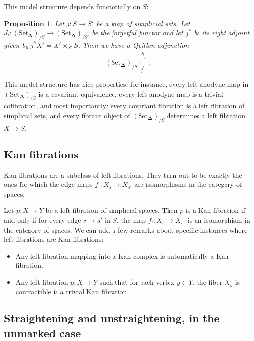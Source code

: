 \documentclass{amsart}
\newcommand{\8}{\ensuremath{\infty}}
\newcommand{\SSet}{\ensuremath{\text{Set}_{\boldsymbol{\Delta}}}}
\newtheorem{proposition}{Proposition}
\begin{document}
This model structure depends functorially on $S$:
\begin{proposition}
  Let $j:S\rightarrow S'$ be a map of simplicial sets. Let $J_!: (\SSet)_{/S}\rightarrow (\SSet)_{/S'}$ be the forgetful functor and let $j^*$ be its right adjoint given by $j^*X' = X'\times_{S'} S$. Then we have a Quillen adjunction
  \[(\SSet)_{/S}\underset{j^*}{\overset{j_!}{\overset{\rightarrow}{\leftarrow}}}.\]
\end{proposition}

This model structure has nice properties: for instance, every left anodyne map in $(\SSet)_{/S}$ is a covariant equivalence, every left anodyne map is a trivial cofibration, and most importantly: every covariant fibration is a left fibration of simplicial sets, and every fibrant object of $(\SSet)_{/S}$ determines a left fibration $X\rightarrow S$.

\subsection{Kan fibrations}
Kan fibrations are a subclass of left fibrations. They turn out to be exactly the ones for which the edge maps $f_!:X_s\rightarrow X_{s'}$ are isomorphisms in the category of spaces.

Let $p:X\rightarrow Y$ be a left fibration of simplicial spaces. Then $p$ is a Kan fibration if and only if for every edge $s\rightarrow s'$ in $S$, the map $f_!:X_s\rightarrow X_{s'}$ is an isomorphism in the category of spaces.
We can add a few remarks about specific instances where left fibrations are Kan fibrations:
\begin{itemize}
  \item Any left fibration mapping into a Kan complex is automatically a Kan fibration.
  \item Any left fibration $p:X\rightarrow Y$ such that for each vertex $y\in Y$, the fiber $X_y$ is contractible is a trivial Kan fibration.
\end{itemize}


\subsection{Straightening and unstraightening, in the unmarked case}
\end{document}
